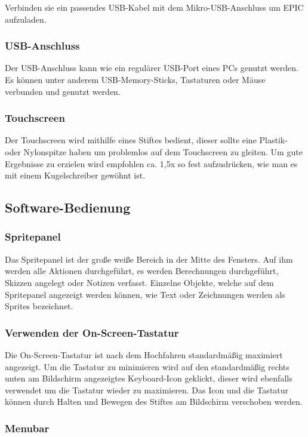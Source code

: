 Verbinden sie ein passendes USB-Kabel mit dem Mikro-USB-Anschluss um EPIC aufzuladen. 

\subsubsection{USB-Anschluss}

Der USB-Anschluss kann wie ein regulärer USB-Port eines PCs genutzt werden. Es können unter anderem USB-Memory-Sticks, Tastaturen oder Mäuse verbunden und genutzt werden.

\subsubsection{Touchscreen}

Der Touchscreen wird mithilfe eines Stiftes bedient, dieser sollte eine Plastik- oder Nylonspitze haben um problemlos auf dem Touchscreen zu gleiten. Um gute Ergebnisse zu erzielen wird empfohlen ca. 1,5x so fest aufzudrücken, wie man es mit einem Kugelschreiber gewöhnt ist. 

\subsection{Software-Bedienung}

\subsubsection{Spritepanel}
Das Spritepanel ist der große weiße Bereich in der Mitte des Fensters. Auf ihm werden alle Aktionen durchgeführt, es werden Berechnungen durchgeführt, Skizzen angelegt oder Notizen verfasst. Einzelne Objekte, welche auf dem Spritepanel angezeigt werden können, wie Text oder Zeichnungen werden als Sprites bezeichnet.

\subsubsection{Verwenden der On-Screen-Tastatur}

Die On-Screen-Tastatur ist nach dem Hochfahren standardmäßig maximiert angezeigt. Um die Tastatur zu minimieren wird auf den standardmäßig rechts unten am Bildschirm angezeigtes Keyboard-Icon geklickt, dieser wird ebenfalls verwendet um die Tastatur wieder zu maximieren. Das Icon und die Tastatur können durch Halten und Bewegen des Stiftes am Bildschirm verschoben werden.


\subsubsection{Menubar}

